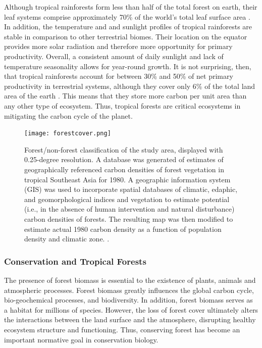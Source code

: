 Although tropical rainforests form less than half of the total forest on earth, their leaf systems comprise approximately 70\% of the world's total leaf surface area \citep{gower1999direct}. In addition, the temperature and and sunlight profiles of tropical rainforests are stable in comparison to other terrestrial biomes. Their location on the equator provides more solar radiation and therefore more opportunity for primary productivity. Overall, a consistent amount of daily sunlight and lack of temperature seasonality allows for year-round growth.   It is not surprising, then, that tropical rainforests account for between 30\% and 50\% of net primary productivity in terrestrial systems, although they cover only 6\% of the total land area of the earth \citep{houghton2005aboveground}. This means that they store more carbon per unit area than any other type of ecosystem. Thus, tropical forests are critical ecosystems in mitigating the carbon cycle of the planet. 
  
 \begin{figure}[ht]
    \centering
        \texttt{[image: forestcover.png]}
        \caption{Forest/non-forest classification of the study area, displayed with 0.25-degree resolution. A database was generated of estimates of geographically referenced carbon densities of forest vegetation in tropical Southeast Asia for 1980. A geographic information system (GIS) was used to incorporate spatial databases of climatic, edaphic, and geomorphological indices and vegetation to estimate potential (i.e., in the absence of human intervention and natural disturbance) carbon densities of forests. The resulting map was then modified to estimate actual 1980 carbon density as a function of population density and climatic zone. \citep{brown1991biomass}.}
			\label{fig:SE_forests}
    \end{figure}

\subsubsection{Conservation and Tropical Forests}

The presence of forest biomass is essential to the existence of plants, animals and atmospheric processes. Forest biomass greatly influences the global carbon cycle, bio-geochemical processes, and biodiversity.  In addition, forest biomass serves as a habitat for millions of species. However, the loss of forest cover ultimately alters the interactions between the land surface and the atmosphere, disrupting healthy ecosystem structure and functioning. Thus, conserving forest has become an important normative goal in conservation biology.

